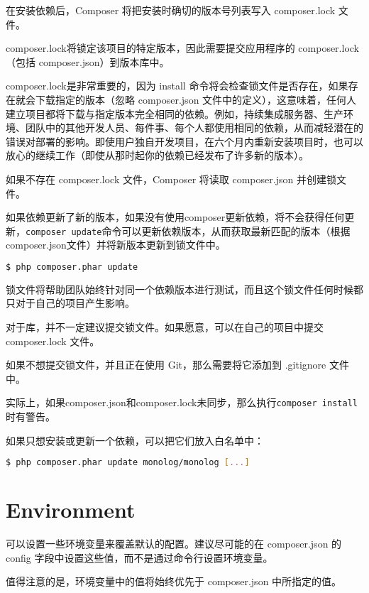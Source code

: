 在安装依赖后，Composer 将把安装时确切的版本号列表写入 composer.lock 文件。

composer.lock将锁定该项目的特定版本，因此需要提交应用程序的 composer.lock （包括 composer.json）到版本库中。

composer.lock是非常重要的，因为 install 命令将会检查锁文件是否存在，如果存在就会下载指定的版本（忽略 composer.json 文件中的定义），这意味着，任何人建立项目都将下载与指定版本完全相同的依赖。例如，持续集成服务器、生产环境、团队中的其他开发人员、每件事、每个人都使用相同的依赖，从而减轻潜在的错误对部署的影响。即使用户独自开发项目，在六个月内重新安装项目时，也可以放心的继续工作（即使从那时起你的依赖已经发布了许多新的版本）。

如果不存在 composer.lock 文件，Composer 将读取 composer.json 并创建锁文件。

如果依赖更新了新的版本，如果没有使用composer更新依赖，将不会获得任何更新，\texttt{composer update}命令可以更新依赖版本，从而获取最新匹配的版本（根据composer.json文件）并将新版本更新到锁文件中。

\begin{lstlisting}[language=bash]
$ php composer.phar update
\end{lstlisting}




锁文件将帮助团队始终针对同一个依赖版本进行测试，而且这个锁文件任何时候都只对于自己的项目产生影响。


对于库，并不一定建议提交锁文件。如果愿意，可以在自己的项目中提交 composer.lock 文件。

如果不想提交锁文件，并且正在使用 Git，那么需要将它添加到 .gitignore 文件中。

实际上，如果composer.json和composer.lock未同步，那么执行\texttt{composer install}时有警告。

如果只想安装或更新一个依赖，可以把它们放入白名单中：

\begin{lstlisting}[language=bash]
$ php composer.phar update monolog/monolog [...]
\end{lstlisting}

\section{Environment}


可以设置一些环境变量来覆盖默认的配置。建议尽可能的在 composer.json 的 config 字段中设置这些值，而不是通过命令行设置环境变量。

值得注意的是，环境变量中的值将始终优先于 composer.json 中所指定的值。

